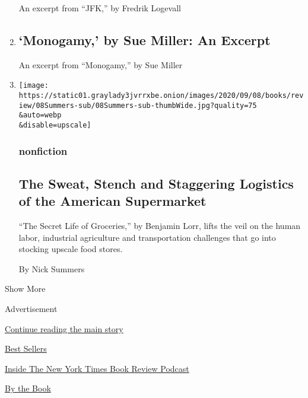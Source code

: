\begin{enumerate}
  An excerpt from ``JFK,'' by Fredrik Logevall
\item
  \href{/2020/09/08/books/review/monogamy-by-sue-miller-an-excerpt.html}{}

  \hypertarget{monogamy-by-sue-miller-an-excerpt}{%
  \subsection{`Monogamy,' by Sue Miller: An
  Excerpt}\label{monogamy-by-sue-miller-an-excerpt}}

  An excerpt from ``Monogamy,'' by Sue Miller
\item
  \href{/2020/09/08/books/review/the-secret-life-of-groceries-benjamin-lorr.html}{}

  \texttt{[image: https://static01.graylady3jvrrxbe.onion/images/2020/09/08/books/review/08Summers-sub/08Summers-sub-thumbWide.jpg?quality=75\\\&auto=webp\\\&disable=upscale]}

  \hypertarget{nonfiction-7}{%
  \subsubsection{nonfiction}\label{nonfiction-7}}

  \hypertarget{the-sweat-stench-and-staggering-logistics-of-the-american-supermarket}{%
  \subsection{The Sweat, Stench and Staggering Logistics of the American
  Supermarket}\label{the-sweat-stench-and-staggering-logistics-of-the-american-supermarket}}

  ``The Secret Life of Groceries,'' by Benjamin Lorr, lifts the veil on
  the human labor, industrial agriculture and transportation challenges
  that go into stocking upscale food stores.

  By Nick Summers
\end{enumerate}

Show More

Advertisement

\protect\hyperlink{after-mid2}{Continue reading the main story}

\href{https://www.nytimes3xbfgragh.onion/best-sellers-books/overview.html}{Best
Sellers}

\href{https://www.nytimes3xbfgragh.onion/column/book-review-podcast}{Inside
The New York Times Book Review Podcast}

\href{https://www.nytimes3xbfgragh.onion/column/by-the-book}{By the
Book}

